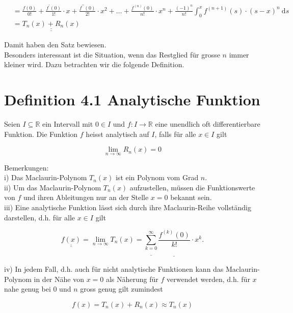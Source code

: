 \documentclass[10pt]{article}
\begin{document}
\begin{align*}
& =\frac{f(0)}{0!}+\frac{f^{\prime}(0)}{1!} \cdot x+\frac{f^{\prime \prime}(0)}{2!} \cdot x^{2}+\ldots+\frac{f^{(n)}(0)}{n!} \cdot x^{n}+\frac{(-1)^{n}}{n!} \int_{0}^{x} f^{(n+1)}(s) \cdot(s-x)^{n} \mathrm{~d} s \\
& =\underline{\underline{T_{n}(x)+R_{n}(x)}} \tag{4.4}
\end{align*}


Damit haben den Satz bewiesen.\\
Besonders interessant ist die Situation, wenn das Restglied für grosse $n$ immer kleiner wird. Dazu betrachten wir die folgende Definition.

\section*{Definition 4.1 Analytische Funktion}
Seien $I \subseteq \mathbb{R}$ ein Intervall mit $0 \in I$ und $f: I \rightarrow \mathbb{R}$ eine unendlich oft differentierbare Funktion. Die Funktion $f$ heisst analytisch auf $I$, falls für alle $x \in I$ gilt


\begin{equation*}
\lim _{n \rightarrow \infty} R_{n}(x)=0 \tag{4.5}
\end{equation*}


Bemerkungen:\\
i) Das Maclaurin-Polynom $T_{n}(x)$ ist ein Polynom vom Grad $n$.\\
ii) Um das Maclaurin-Polynom $T_{n}(x)$ aufzustellen, müssen die Funktionswerte von $f$ und ihren Ableitungen nur an der Stelle $x=0$ bekannt sein.\\
iii) Eine analytische Funktion lässt sich durch ihre Maclaurin-Reihe vollständig darstellen, d.h. für alle $x \in I$ gilt


\begin{equation*}
\underline{\underline{f(x)}}=\lim _{n \rightarrow \infty} T_{n}(x)=\underline{\underline{\sum_{k=0}^{\infty}} \frac{f^{(k)}(0)}{k!} \cdot x^{k} .} \tag{4.6}
\end{equation*}


iv) In jedem Fall, d.h. auch für nicht analytische Funktionen kann das Maclaurin-Polynom in der Nähe von $x=0$ als Näherung für $f$ verwendet werden, d.h. für $x$ nahe genug bei 0 und $n$ gross genug gilt zumindest


\begin{equation*}
f(x)=T_{n}(x)+R_{n}(x) \approx T_{n}(x) \tag{4.7}
\end{equation*}
\end{document}
